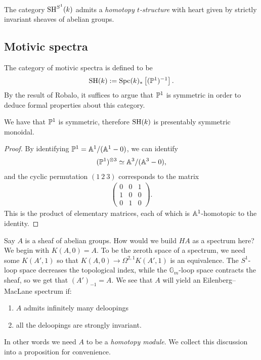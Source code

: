\documentclass[11pt,openany]{book}
\begin{document}
The category $\SH^{S^1}(k)$ admits a \textit{homotopy $t$-structure} with heart given by strictly invariant sheaves of abelian groups.

\subsection{Motivic spectra}

The category of motivic spectra is defined to be
\begin{align*}
    \SH(k) := \Spc(k)_\ast \left[ (\P^1)^{-1} \right].
\end{align*}
By the result of Robalo, it suffices to argue that $\P^1$ is symmetric in order to deduce formal properties about this category.

\begin{proposition} We have that $\P^1$ is symmetric, therefore $\SH(k)$ is presentably symmetric monoidal.
\end{proposition}
\begin{proof} By identifying $\P^1 = \A^1/(\A^1-0)$, we can identify
\begin{align*}
    (\P^1)^{\otimes3} \simeq \A^3 / (\A^3-0),
\end{align*}
and the cyclic permutation $(1\ 2\ 3)$ corresponds to the matrix
\begin{align*}
    \begin{pmatrix} 0 & 0 & 1 \\
    1 & 0 & 0  \\
    0 & 1 & 0\end{pmatrix}.
\end{align*}
This is the product of elementary matrices, each of which is $\A^1$-homotopic to the identity.
\end{proof}

Say $A$ is a sheaf of abelian groups. How would we build $HA$ as a spectrum here? We begin with $K(A,0) = A$. To be the zeroth space of a spectrum, we need some $K(A',1)$ so that $K(A,0) \to \Omega^{2,1}K(A',1)$ is an equivalence. The $S^1$-loop space decreases the topological index, while the $\mathbb{G}_m$-loop space contracts the sheaf, so we get that $(A')_{-1} = A$. We see that $A$ will yield an Eilenberg--MacLane spectrum if:
\begin{enumerate}
    \item $A$ admits infinitely many deloopings
    \item all the deloopings are strongly invariant.
\end{enumerate}
In other words we need $A$ to be a \textit{homotopy module}. We collect this discussion into a proposition for convenience.
\end{document}
